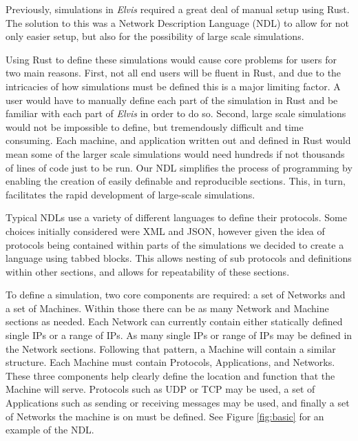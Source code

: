 \documentclass[journal]{IEEEtran} %
\newcommand{\elvis}{\textit{Elvis}}
\begin{document}
Previously, simulations in \elvis{} required a great deal of manual setup using Rust. The solution to this was a Network Description Language (NDL) to allow for not only easier setup, but also for the possibility of large scale simulations.

Using Rust to define these simulations would cause core problems for users for two main reasons. First, not all end users will be fluent in Rust, and due to the intricacies of how simulations must be defined this is a major limiting factor. A user would have to manually define each part of the simulation in Rust and be familiar with each part of \elvis{} in order to do so. Second, large scale simulations would not be impossible to define, but tremendously difficult and time consuming. Each machine, and application written out and defined in Rust would mean some of the larger scale simulations would need hundreds if not thousands of lines of code just to be run. Our NDL simplifies the process of programming by enabling the creation of easily definable and reproducible sections. This, in turn, facilitates the rapid development of large-scale simulations.

Typical NDLs use a variety of different languages to define their protocols. Some choices initially considered were XML and JSON, however given the idea of protocols being contained within parts of the simulations we decided to create a language using tabbed blocks. This allows nesting of sub protocols and definitions within other sections, and allows for repeatability of these sections.

To define a simulation, two core components are required: a set of Networks and a set of Machines. Within those there can be as  many Network and Machine sections as needed. Each Network can currently contain either statically defined single IPs or a range of IPs. As many single IPs or range of IPs may be defined in the Network sections. Following that pattern, a Machine will contain a similar structure. Each Machine must contain Protocols, Applications, and Networks. These three components help clearly define the location and function that the Machine will serve. Protocols such as UDP or TCP may be used, a set of Applications such as sending or receiving messages may be used, and finally a set of Networks the machine is on must be defined. See Figure \ref{fig:basic} for an example of the NDL.
\end{document}
